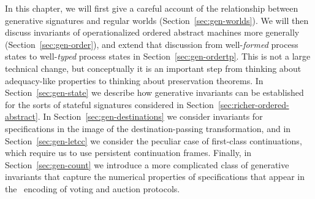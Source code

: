 In this chapter, we will first give a careful account of the
relationship between generative signatures and regular worlds
(Section~\ref{sec:gen-worlds}). We will then discuss invariants of
operationalized ordered abstract machines more generally
(Section~\ref{sec:gen-order}), and extend that discussion from
well-{\it formed} process states to well-{\it typed} process states in
Section~\ref{sec:gen-ordertp}.  This is not a large technical change,
but conceptually it is an important step from thinking about
adequacy-like properties to thinking about preservation theorems. In
Section~\ref{sec:gen-state} we describe how generative invariants can
be established for the sorts of stateful signatures considered in
Section~\ref{sec:richer-ordered-abstract}. In
Section~\ref{sec:gen-destinations} we consider invariants for
specifications in the image of the destination-passing transformation,
and in Section~\ref{sec:gen-letcc} we consider the peculiar case of
first-class continuations, which require us to use persistent
continuation frames. Finally, in Section~\ref{sec:gen-count} we
introduce a more complicated class of generative invariants that
capture the numerical properties of specifications that appear in the
\sls~encoding of voting and auction protocols.






